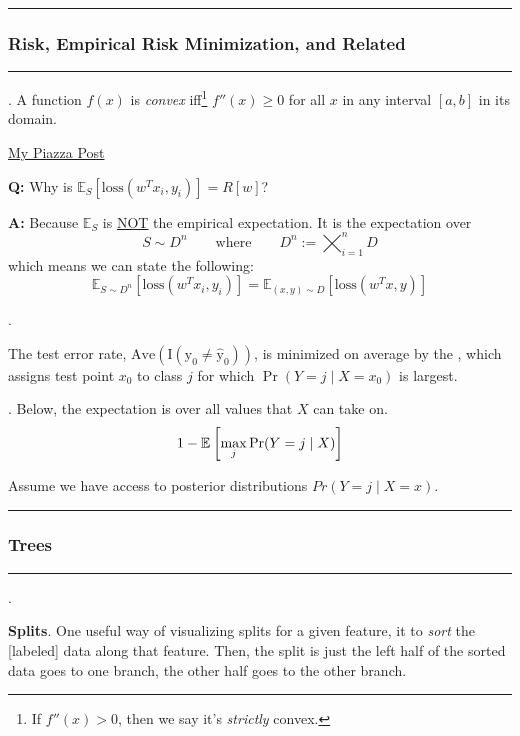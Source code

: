 \documentclass[12pt]{article}
\newcommand{\myspace}{\vspace{2\bigskipamount}}
\newcommand\p{\Needspace{10\baselineskip} \noindent}
\begin{document}
\myspace
{}
\hrule 
\subsubsection{Risk, Empirical Risk Minimization, and Related}
\hrule 

\p {}. A function $f(x)$ is \textit{convex} iff\footnote{If $f''(x) > 0$, then we say it's \textit{strictly} convex.} $f''(x) \ge 0$ for all $x$ in any interval $[a, b]$ in its domain.

\myspace 
\p {} \green{[SOLVED]} \href{https://piazza.com/class/is83id8c49m5at?cid=641}{My Piazza Post}
\begin{compactitem}
	\item \textbf{Q:} Why is $\mathbb{E}_S\left[\text{loss}(w^T x_i, y_i) \right]= R[w]$? 
	\item \textbf{A:} Because $\mathbb{E}_S$ is \underline{NOT} the empirical expectation. It is the expectation over
	$$ S \sim D^n \qquad \text{where} \qquad D^n := \bigtimes_{i = 1}^{n} D $$ 
	which means we can state the following:
	$$\mathbb{E}_{S \sim D^n}[ \mathrm{loss}(w^T x_i, y_i) ]= \mathbb{E}_{(x,y)\sim D} [\mathrm{loss}(w^T x, y)]$$
\end{compactitem}

\myspace
\p {}. 
\begin{compactitem}[$\rightarrow$]
	\item The test error rate, $\mathrm{Ave(I(y_0 \ne \hat y_0))}$, is minimized on average by the , which assigns test point $x_0$ to class $j$ for which $\Pr(Y = j \mid X = x_0)$ is largest. 
	\item  {}. Below, the expectation is over all values that $X$ can take on. $$ 1 - \mathbb{E}_{}\left[\max_j \Pr(Y = j \mid X)\right]$$
	\item Assume we have access to posterior distributions $Pr(Y = j \mid X = x)$. 
\end{compactitem}


\myspace
{}
\hrule 
\subsubsection{Trees}
\hrule

\myspace
\p {}. 
\begin{compactitem}
	\item \textbf{Splits}. One useful way of visualizing splits for a given feature, it to \textit{sort} the [labeled] data along that feature. Then, the split is just the left half of the sorted data goes to one branch, the other half goes to the other branch. 
\end{compactitem}
\end{document}

